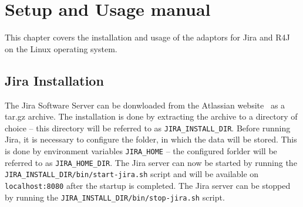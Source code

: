 
%







%

\chapter{Setup and Usage manual}
\label{chapter:manual}
This chapter covers the installation and usage of the adaptors for Jira and R4J on the Linux operating system.

\section{Jira Installation}
The Jira Software Server can be donwloaded from the Atlassian website \cite{jira_download} as a tar.gz archive. The installation is done by extracting the archive to a directory of choice -- this directory will be referred to as \texttt{JIRA\_INSTALL\_DIR}. Before running Jira, it is necessary to configure the folder, in which the data will be stored. This is done by environment variables \texttt{JIRA\_HOME} -- the configured forlder will be referred to as \texttt{JIRA\_HOME\_DIR}. The Jira server can now be started by running the \texttt{JIRA\_INSTALL\_DIR/bin/start-jira.sh} script and will be available on \texttt{localhost:8080} after the startup is completed. The Jira server can be stopped by running the \texttt{JIRA\_INSTALL\_DIR/bin/stop-jira.sh} script.

